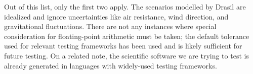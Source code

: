 Out of this list, only the first two apply. The scenarios modelled by Drasil
are idealized and ignore uncertainties like air resistance, wind direction,
and gravitational fluctuations. There are not any instances where special
consideration for floating-point arithmetic must be taken; the default
tolerance used for relevant testing frameworks has been used
 and is likely sufficient for future testing. On a related
note, the scientific software we are trying to test is already generated in
languages with widely-used testing frameworks. 
